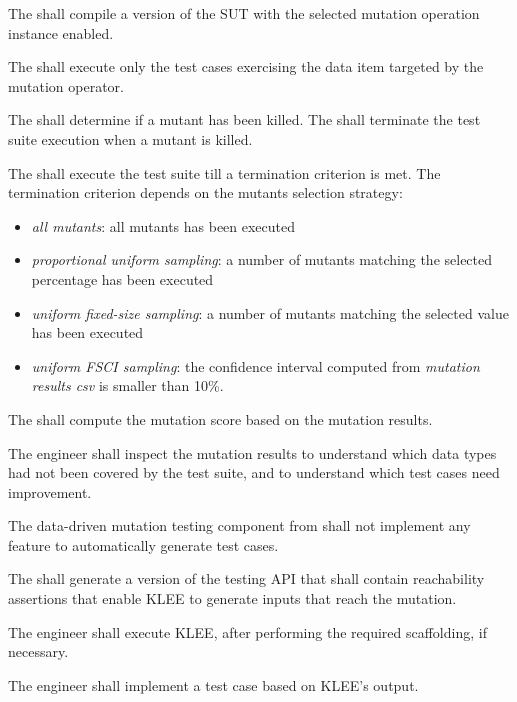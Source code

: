 \RQ{} The \FAQAS shall compile a version of the SUT with the selected mutation operation instance enabled.

\RQ{} The \FAQAS shall execute only the test cases exercising the data item targeted by the mutation operator.

\RQ{} The \FAQAS shall determine if a mutant has been killed. The \FAQAS shall terminate the test suite execution when a mutant is killed.

\RQ{} The \FAQAS shall execute the test suite till a termination criterion is met. The termination criterion depends on the mutants selection strategy:
\begin{itemize}
\item \emph{all mutants}: all mutants has been executed
\item \emph{proportional uniform sampling}: a number of mutants matching the selected percentage has been executed
\item \emph{uniform fixed-size sampling}: a number of mutants matching the selected value has been executed
\item \emph{uniform FSCI sampling}: the confidence interval computed from \emph{mutation results csv} is smaller than 10\%.
\end{itemize}

\RQ{} The \FAQAS shall compute the mutation score based on the mutation results.

\RQ{} The engineer shall inspect the mutation results to understand which data types had not been covered by the test suite, and to understand which test cases need improvement.

\RQ{} The data-driven mutation testing component from \FAQAS shall not implement any feature to automatically generate test cases. 

\RQ{} The \FAQAS shall generate a version of the testing API that shall contain reachability assertions that enable KLEE to generate inputs that reach the mutation.

\RQ{} The engineer shall execute KLEE, after performing the required scaffolding, if necessary. 

\RQ{} The engineer shall implement a test case based on KLEE's output.